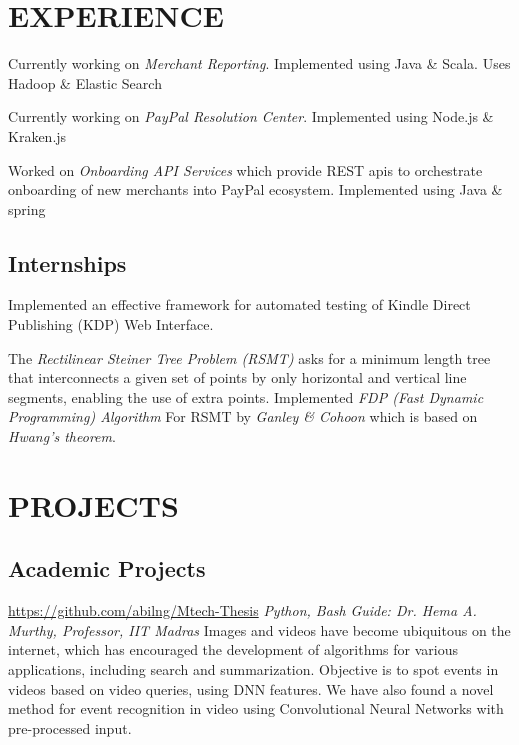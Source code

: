 \documentclass[11pt, a4paper, sans]{moderncv}
\begin{document}
\section{EXPERIENCE}

{ Currently working on \textit{Merchant Reporting}. Implemented using Java \& Scala. Uses Hadoop \& Elastic Search}

{ Currently working on \textit{PayPal Resolution Center}. Implemented using Node.js \& Kraken.js }

{Worked on \textit{Onboarding API Services} which provide REST apis to orchestrate onboarding of new merchants into PayPal ecosystem. Implemented using Java \& spring }


\subsection{Internships}
{Implemented an effective framework for automated testing of Kindle Direct Publishing (KDP) Web Interface.}

{The \textit{Rectilinear Steiner Tree Problem (RSMT)} asks for a minimum length tree that interconnects a given set of points by only horizontal and vertical line segments, enabling the use of extra points. Implemented \textit{ FDP (Fast Dynamic Programming) Algorithm } For RSMT by \textit{ Ganley \& Cohoon } which is based on \textit{ Hwang’s theorem}}.

\section{PROJECTS}
\subsection{Academic Projects}
{\newline \url{https://github.com/abilng/Mtech-Thesis}}
{\hfill \textit{Python, Bash}}
{\newline \textit{Guide: Dr. Hema A. Murthy, Professor, IIT Madras}}
{Images and videos have become ubiquitous on the internet, which has encouraged the development of algorithms for various applications, including search and summarization. Objective is to spot events in videos based on video queries, using DNN features. We have also found a novel method for event recognition in video using Convolutional Neural Networks with pre-processed input.}
\end{document}
